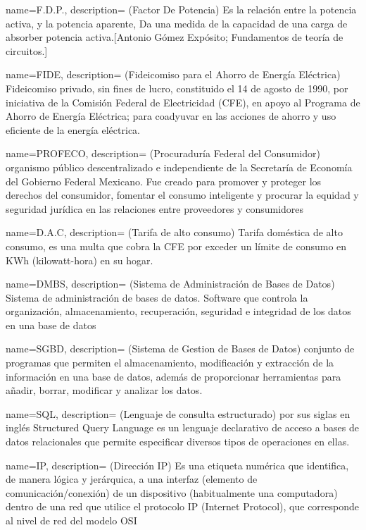 {
  name=F.D.P.,
  description={ (Factor De Potencia) Es la relación entre la potencia activa, y la potencia aparente, Da una medida de la capacidad de una carga de absorber potencia activa.[Antonio Gómez Expósito; Fundamentos de teoría de circuitos.]
}
}

{
  name=FIDE,
  description={ (Fideicomiso para el Ahorro de Energía Eléctrica) Fideicomiso privado, sin fines de lucro, constituido el 14 de agosto de 1990, por iniciativa de la Comisión Federal de Electricidad (CFE), en apoyo al Programa de Ahorro de Energía Eléctrica; para coadyuvar en las acciones de ahorro y uso eficiente de la energía eléctrica. 
}
}

{
  name=PROFECO,
  description={ (Procuraduría Federal del Consumidor) organismo público descentralizado e independiente de la Secretaría de Economía del Gobierno Federal Mexicano. Fue creado para promover y proteger los derechos del consumidor, fomentar el consumo inteligente y procurar la equidad y seguridad jurídica en las relaciones entre proveedores y consumidores
}
}

{
  name=D.A.C,
  description={ (Tarifa de alto consumo) Tarifa doméstica de alto consumo, es una multa que cobra la CFE por exceder un límite de consumo en KWh (kilowatt-hora) en su hogar.
}
}

{
  name=DMBS,
  description={ (Sistema de Administración de Bases de Datos) Sistema de administración de bases de datos. Software que controla la organización, almacenamiento, recuperación, seguridad e integridad de los datos en una base de datos}
}

{
  name=SGBD,
  description={ (Sistema de Gestion de Bases de Datos) conjunto de programas que permiten el almacenamiento, modificación y extracción de la información en una base de datos, además de proporcionar herramientas para añadir, borrar, modificar y analizar los datos.}
}

{
  name=SQL,
  description={ (Lenguaje de consulta estructurado) por sus siglas en inglés Structured Query Language es un lenguaje declarativo de acceso a bases de datos relacionales que permite especificar diversos tipos de operaciones en ellas.}
}

{
  name=IP,
  description={ (Dirección IP) Es una etiqueta numérica que identifica, de manera lógica y jerárquica, a una interfaz (elemento de comunicación/conexión) de un dispositivo (habitualmente una computadora) dentro de una red que utilice el protocolo IP (Internet Protocol), que corresponde al nivel de red del modelo OSI}
}

